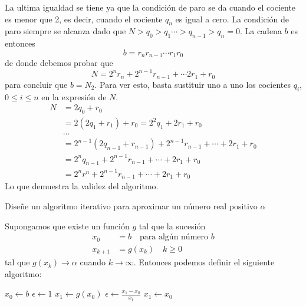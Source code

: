 \documentclass[11pt, oneside]{article}
\begin{document}
\begin{problema}
La ultima igualdad se tiene ya que la condición de paro se da cuando el cociente es menor que 2, es decir, cuando el cociente $q_n$ es igual a cero. La condición de paro siempre se alcanza dado que $N>q_0>q_1\cdots>q_{n-1}>q_n=0$. La cadena $b$ es entonces  $$b= r_n r_{n-1}\cdots r_1r_0$$ de donde debemos probar que $$N=2^nr_n + 2^{n-1}r_{n-1} + \cdots 2r_1+r_0$$ para concluir que $b=N_2$. Para ver esto, basta sustituir uno a uno los cocientes $q_i$, $0\le i \le n$ en la expresión de $N$.
\begin{align*}
    N &= 2q_0 + r_0\\
      &= 2(2q_1 + r_1) + r_0 = 2^2q_1 + 2r_1 + r_0\\
      &\hdots\\
      &= 2^{n-1}(2q_{n-1} + r_{n-1}) + 2^{n-1}r_{n-1} + \cdots + 2r_1 + r_0\\
      &= 2^nq_{n-1} +2^{n-1}r_{n-1} + \cdots + 2r_1 + r_0\\
      &= 2^nr^n +2^{n-1}r_{n-1} + \cdots + 2r_1 + r_0
\end{align*}
Lo que demuestra la validez del algoritmo.
\end{problema}

\begin{problema}
    Diseñe un algoritmo iterativo para aproximar un número real positivo \(\alpha\)

    Supongamos que existe un función \(g\) tal que la sucesión 
    \begin{align*}
        x_0&=b\quad \text{para algún número } b\\
        x_{k+1}&=g(x_k)\quad k\ge0
    \end{align*}
    tal que \(g(x_k)\to\alpha\) cuando \(k\to\infty\). Entonces podemos definir el siguiente algoritmo:
    
    \begin{algorithm}\caption{Algoritmo}
        \begin{algorithmic}
        \State \(x_0\gets b\)
        \State \(\epsilon\gets 1\)
        \State \(x_1\gets g(x_0)\)
        \State $\epsilon\gets\frac{x_1-x_0}{x_1}$
        \State $x_1\gets x_0$
        \EndWhile 
        \end{algorithmic}
    \end{algorithm}

\end{problema}
\end{document}

